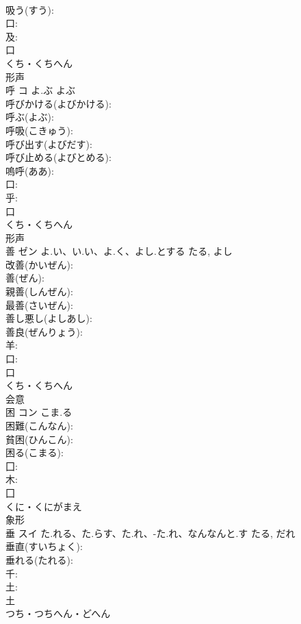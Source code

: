 \documentclass[8pt]{extreport}
\begin{document}
\begin{CJK}{UTF8}{min}
\\	吸う(すう): 
\\	口: 
\\	及: 
\\	口	
\\	くち・くちへん	
\\	形声 
\\	呼	コ	よ.ぶ	よぶ	
\\	呼びかける(よびかける): 
\\	呼ぶ(よぶ): 
\\	呼吸(こきゅう): 
\\	呼び出す(よびだす): 
\\	呼び止める(よびとめる): 
\\	嗚呼(ああ): 
\\	口: 
\\	乎: 
\\	口	
\\	くち・くちへん	
\\	形声 
\\	善	ゼン	よ.い、い.い、よ.く、よし.とする	たる, よし	
\\	改善(かいぜん): 
\\	善(ぜん): 
\\	親善(しんぜん): 
\\	最善(さいぜん): 
\\	善し悪し(よしあし): 
\\	善良(ぜんりょう): 
\\	羊: 
\\	口: 
\\	口	
\\	くち・くちへん	
\\	会意 
\\	困	コン	こま.る		
\\	困難(こんなん): 
\\	貧困(ひんこん): 
\\	困る(こまる): 
\\	囗: 
\\	木: 
\\	囗	
\\	くに・くにがまえ	
\\	象形 
\\	垂	スイ	た.れる、た.らす、た.れ、-た.れ、なんなんと.す	たる, だれ	
\\	垂直(すいちょく): 
\\	垂れる(たれる): 
\\	千: 
\\	土: 
\\	土	
\\	つち・つちへん・どへん	

\end{CJK}
\end{document}

